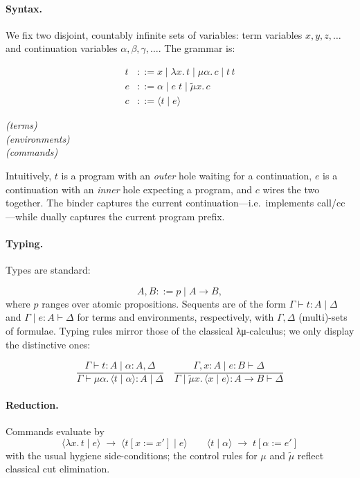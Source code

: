 \documentclass{ecai}
\begin{document}
\begin{gpt}
\paragraph{Syntax.}
We fix two disjoint, countably infinite sets of variables:
term variables $x,y,z,\dots$ and continuation variables
$\alpha,\beta,\gamma,\dots$.  The grammar is:

\medskip
\begin{minipage}{0.48\linewidth}
\begin{align*}
t &::= x \mid \lambda x.\,t \mid \mu\alpha.\,c \mid t\,t \\
e &::= \alpha \mid e\;t \mid \tilde\mu x.\,c       \\
c &::= \langle t \mid e \rangle
\end{align*}
\end{minipage}
\hfill
\begin{minipage}{0.48\linewidth}
\textit{(terms)}\\
\textit{(environments)}\\
\textit{(commands)}
\end{minipage}
\medskip

Intuitively, $t$ is a program with an \emph{outer} hole waiting for a
continuation, $e$ is a continuation with an \emph{inner} hole expecting
a program, and $c$ wires the two together.  The binder
 captures the current continuation—i.e.\ implements
\textsf{call/cc}—while  dually captures the
current program prefix.

\paragraph{Typing.}
Types are standard:

\[
A,B ::= p \mid A \to B,
\]
where $p$ ranges over atomic propositions.  Sequents are of the form
$\Gamma \vdash t : A \mid \Delta$ and $\Gamma \mid e : A \vdash \Delta$
for terms and environments, respectively, with $\Gamma,\Delta$ (multi)-sets
of formulae.  Typing rules mirror those of the classical
λμ-calculus; we only display the distinctive ones:

\[
\frac{\Gamma \vdash t : A \mid \alpha:A,\Delta}{\Gamma \vdash
  \mu\alpha.\,\langle t \mid \alpha\rangle : A \mid \Delta}
\quad
\frac{\Gamma,x:A \mid e : B \vdash \Delta}{\Gamma \mid
  \tilde\mu x.\,\langle x \mid e\rangle : A\to B \vdash \Delta}
\]

\paragraph{Reduction.}
Commands evaluate by
\[
\langle \lambda x.\,t \mid e \rangle \;\longrightarrow\; \langle t[x:=x'] \mid e \rangle
\qquad
\langle t \mid \alpha\rangle \;\longrightarrow\; t[\alpha:=e']
\]
with the usual hygiene side-conditions; the control rules for $\mu$ and
$\tilde\mu$ reflect classical cut elimination.


\end{gpt}
\end{document}
